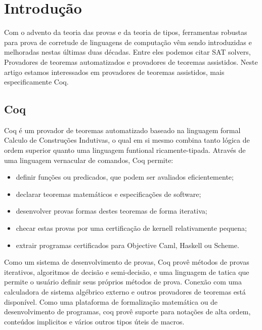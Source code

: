 \chapter{Introdução}
	Com o advento da teoria das provas e da teoria de tipos, ferramentas robustas para prova de corretude de linguagens de computação vêm sendo introduzidas e melhoradas nestas últimas duas décadas. Entre eles podemos citar SAT solvers, Provadores de teoremas automatizados e provadores de teoremas assistidos.
	Neste artigo estamos interessados em provadores de teoremas assistidos, mais especificamente Coq. 
	\section{Coq}
	Coq é um provador de teoremas automatizado  baseado na linguagem formal Calculo de Construções Indutivas, o qual em si mesmo combina tanto lógica de ordem superior quanto uma linguagem funtional ricamente-tipada. Através de uma linguagem vernacular de comandos, Coq permite:
	\begin{itemize}
		\item definir funções ou predicados, que podem ser avaliados eficientemente;
		\item declarar teoremas matemáticos e especificações de software;
		\item desenvolver provas formas destes teoremas de forma iterativa;
		\item checar estas provas por uma certificação de kernell relativamente pequena;
		\item extrair programas certificados para Objective Caml, Haskell ou Scheme.
	\end{itemize}
	Como um sistema de desenvolvimento de provas, Coq provê métodos de provas iterativos, algoritmos de decisão e semi-decisão, e uma linguagem de tatica que permite o usuário definir seus próprios métodos de prova. Conexão com uma calculadora de sistema algébrico externo e outros provadores de teoremas está disponível.
	Como uma plataforma de formalização matemática ou de desenvolvimento de programas, coq provê suporte para notações de alta ordem, conteúdos implicitos e vários outros tipos úteis de macros.
	








